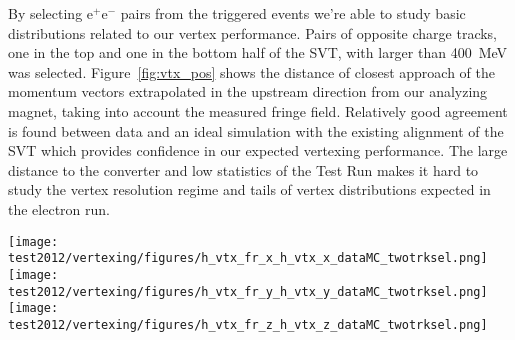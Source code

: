 By selecting e$^{+}$e$^{-}$ pairs from the triggered events we're able to study basic distributions related to our vertex performance. Pairs of opposite charge tracks, one in the top and one in the bottom half of the SVT, with larger than 400~MeV was selected. Figure~\ref{fig:vtx_pos} shows the distance of closest approach of the momentum vectors extrapolated in the upstream direction from our analyzing magnet, taking into account the measured fringe field. Relatively good agreement is found between data and an ideal simulation with the existing alignment of the SVT which provides confidence in our expected vertexing performance. The large distance to the converter and low statistics of the Test Run makes it hard to study the vertex resolution regime and tails of vertex distributions expected in the electron run. 
\begin{figure*}[t]
\texttt{[image: test2012/vertexing/figures/h\_vtx\_fr\_x\_h\_vtx\_x\_dataMC\_twotrksel.png]}
\texttt{[image: test2012/vertexing/figures/h\_vtx\_fr\_y\_h\_vtx\_y\_dataMC\_twotrksel.png]}
\texttt{[image: test2012/vertexing/figures/h\_vtx\_fr\_z\_h\_vtx\_z\_dataMC\_twotrksel.png]}
\caption{\small{Vertex position represented by the distance of closest approach of the extrapolated momentum vectors upstream of the analyzing magnet. The overall shift from zero is due to a 30~mrad rotation of the SVT with respect to the beam line.}}\label{fig:vtx_pos}
\end{figure*}
